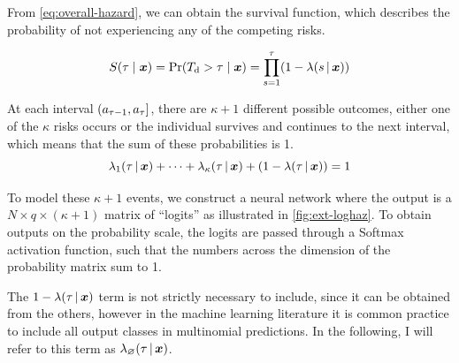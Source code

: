 From \cref{eq:overall-hazard}, we can obtain the survival function,
which describes the probability of not experiencing any of the competing
risks.

\begin{equation}
    S(\tau \mid \bm{x}) = \Pr({T_{\mathrm{d}}} > \tau \mid \bm{x}) 
    = \prod_{s=1}^{\tau} (1 - \lambda(s \,|\, \bm{x}))
\end{equation}


At each interval \((a_{\tau-1}, a_{\tau}]\), 
there are \(\kappa + 1\) different possible outcomes,
either one of the \(\kappa\) risks occurs
or the individual survives and continues to the next interval,
which means that the sum of these probabilities is 1.
\begin{equation}
    \lambda_{1}(\tau \,|\, \bm{x}) 
    + \dots
    + \lambda_{\kappa}(\tau \,|\, \bm{x})
    + (1 - \lambda(\tau \,|\, \bm{x}))
    = 1
\end{equation}

To model these \(\kappa + 1\) events,
we construct a neural network where the output is
a \(N \times q \times (\kappa + 1)\) matrix of \enquote{logits}%
as illustrated in \cref{fig:ext-loghaz}.
To obtain outputs on the probability scale,
the logits are passed through a Softmax activation function,
such that the numbers across the dimension of the probability matrix 
sum to 1.

The \(1 - \lambda(\tau \,|\, \bm{x})\) term is not strictly necessary 
to include, since it can be obtained from the others, 
however in the machine learning literature it is common practice to include all 
output classes in multinomial predictions. In the following, 
I will refer to this term as \(\lambda_\varnothing(\tau \,|\, \bm{x})\).


